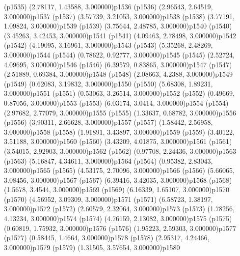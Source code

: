 \psdot(p1535)
\psPoint(2.78117, 1.43588, 3.000000){p1536}
\psdot(p1536)
\psPoint(2.96543, 2.64519, 3.000000){p1537}
\psdot(p1537)
\psPoint(3.57739, 3.21053, 3.000000){p1538}
\psdot(p1538)
\psPoint(3.77191, 1.09824, 3.000000){p1539}
\psdot(p1539)
\psPoint(3.75644, 2.48785, 3.000000){p1540}
\psdot(p1540)
\psPoint(3.45263, 3.42453, 3.000000){p1541}
\psdot(p1541)
\psPoint(4.09463, 2.78498, 3.000000){p1542}
\psdot(p1542)
\psPoint(4.19095, 3.16961, 3.000000){p1543}
\psdot(p1543)
\psPoint(5.35268, 2.48269, 3.000000){p1544}
\psdot(p1544)
\psPoint(0.78622, 0.92777, 3.000000){p1545}
\psdot(p1545)
\psPoint(2.52724, 4.09695, 3.000000){p1546}
\psdot(p1546)
\psPoint(6.39579, 0.83865, 3.000000){p1547}
\psdot(p1547)
\psPoint(2.51889, 0.69384, 3.000000){p1548}
\psdot(p1548)
\psPoint(2.08663, 4.2388, 3.000000){p1549}
\psdot(p1549)
\psPoint(0.62083, 3.19832, 3.000000){p1550}
\psdot(p1550)
\psPoint(5.68308, 1.89231, 3.000000){p1551}
\psdot(p1551)
\psPoint(0.53063, 3.26514, 3.000000){p1552}
\psdot(p1552)
\psPoint(0.49669, 0.87056, 3.000000){p1553}
\psdot(p1553)
\psPoint(6.03174, 3.0414, 3.000000){p1554}
\psdot(p1554)
\psPoint(2.97682, 2.77079, 3.000000){p1555}
\psdot(p1555)
\psPoint(1.33637, 0.68782, 3.000000){p1556}
\psdot(p1556)
\psPoint(3.90311, 2.66628, 3.000000){p1557}
\psdot(p1557)
\psPoint(1.58442, 2.56958, 3.000000){p1558}
\psdot(p1558)
\psPoint(1.91891, 3.43897, 3.000000){p1559}
\psdot(p1559)
\psPoint(3.40122, 3.51188, 3.000000){p1560}
\psdot(p1560)
\psPoint(3.43209, 4.01875, 3.000000){p1561}
\psdot(p1561)
\psPoint(3.54015, 2.92903, 3.000000){p1562}
\psdot(p1562)
\psPoint(0.97708, 2.24436, 3.000000){p1563}
\psdot(p1563)
\psPoint(5.16847, 4.34611, 3.000000){p1564}
\psdot(p1564)
\psPoint(0.95382, 2.83043, 3.000000){p1565}
\psdot(p1565)
\psPoint(4.53175, 2.70096, 3.000000){p1566}
\psdot(p1566)
\psPoint(5.66065, 3.08456, 3.000000){p1567}
\psdot(p1567)
\psPoint(6.39416, 3.42035, 3.000000){p1568}
\psdot(p1568)
\psPoint(1.5678, 3.4544, 3.000000){p1569}
\psdot(p1569)
\psPoint(6.16339, 1.65107, 3.000000){p1570}
\psdot(p1570)
\psPoint(4.56952, 3.09309, 3.000000){p1571}
\psdot(p1571)
\psPoint(6.58723, 1.38197, 3.000000){p1572}
\psdot(p1572)
\psPoint(2.60579, 2.32064, 3.000000){p1573}
\psdot(p1573)
\psPoint(1.78256, 4.13234, 3.000000){p1574}
\psdot(p1574)
\psPoint(4.76159, 2.13082, 3.000000){p1575}
\psdot(p1575)
\psPoint(0.60819, 1.75932, 3.000000){p1576}
\psdot(p1576)
\psPoint(1.95223, 2.59303, 3.000000){p1577}
\psdot(p1577)
\psPoint(0.58445, 1.4664, 3.000000){p1578}
\psdot(p1578)
\psPoint(2.95317, 4.24466, 3.000000){p1579}
\psdot(p1579)
\psPoint(1.31505, 3.57654, 3.000000){p1580}
